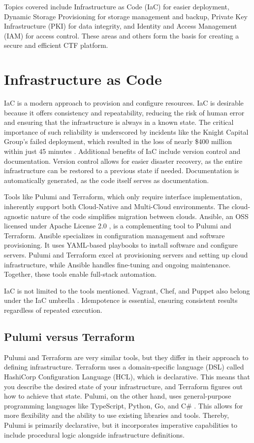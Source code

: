 Topics covered include Infrastructure as Code (IaC) for easier deployment, Dynamic Storage Provisioning for storage management and backup, Private Key Infrastructure (PKI) for data integrity, and Identity and Access Management (IAM) for access control. These areas and others form the basis for creating a secure and efficient CTF platform.

\section{Infrastructure as Code}

IaC is a modern approach to provision and configure resources. IaC is desirable because it offers consistency and repeatability, reducing the risk of human error and ensuring that the infrastructure is always in a known state. The critical importance of such reliability is underscored by incidents like the Knight Capital Group's failed deployment, which resulted in the loss of nearly \$400 million within just 45 minutes \Parencite{seven2014knightmare}. Additional benefits of IaC include version control and documentation. Version control allows for easier disaster recovery, as the entire infrastructure can be restored to a previous state if needed. Documentation is automatically generated, as the code itself serves as documentation. 

Tools like Pulumi and Terraform, which only require interface implementation, inherently support both Cloud-Native and Multi-Cloud environments. The cloud-agnostic nature of the code simplifies migration between clouds. Ansible, an OSS licensed under Apache License 2.0 \Parencite{ansible_license}, is a complementing tool to Pulumi and Terraform. Ansible specializes in configuration management and software provisioning. It uses YAML-based playbooks to install software and configure servers. Pulumi and Terraform excel at provisioning servers and setting up cloud infrastructure, while Ansible handles fine-tuning and ongoing maintenance. Together, these tools enable full-stack automation.

IaC is not limited to the tools mentioned. Vagrant, Chef, and Puppet also belong under the IaC umbrella \Parencite{spacelift_iac_tools}. Idempotence is essential, ensuring consistent results regardless of repeated execution.

\subsection{Pulumi versus Terraform}
Pulumi and Terraform are very similar tools, but they differ in their approach to defining infrastructure. Terraform uses a domain-specific language (DSL) called HashiCorp Configuration Language (HCL), which is declarative. This means that you describe the desired state of your infrastructure, and Terraform figures out how to achieve that state. Pulumi, on the other hand, uses general-purpose programming languages like TypeScript, Python, Go, and C\# \Parencite{pulumi_vs_terraform}. This allows for more flexibility and the ability to use existing libraries and tools. Thereby, Pulumi is primarily declarative, but it incorporates imperative capabilities to include procedural logic alongside infrastructure definitions.

